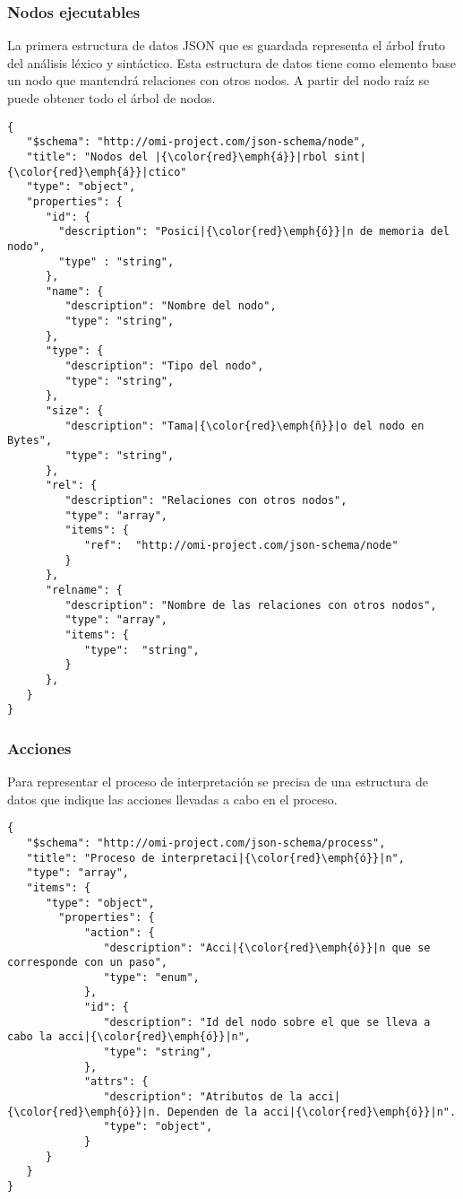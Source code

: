 \subsubsection{Nodos ejecutables}
La primera estructura de datos JSON que es guardada representa el árbol fruto del análisis léxico y sintáctico. Esta estructura de datos tiene como elemento
base un nodo que mantendrá relaciones con otros nodos. A partir del nodo raíz se puede obtener todo el árbol de nodos.


\begin{lstlisting}[language=omi]
{
   "$schema": "http://omi-project.com/json-schema/node",
   "title": "Nodos del |{\color{red}\emph{á}}|rbol sint|{\color{red}\emph{á}}|ctico"
   "type": "object",
   "properties": {
      "id": {
        "description": "Posici|{\color{red}\emph{ó}}|n de memoria del nodo",
        "type" : "string", 
      },
      "name": {
         "description": "Nombre del nodo",
         "type": "string",
      },
      "type": {
         "description": "Tipo del nodo",
         "type": "string",
      },
      "size": {
         "description": "Tama|{\color{red}\emph{ñ}}|o del nodo en Bytes",
         "type": "string",
      },
      "rel": {
         "description": "Relaciones con otros nodos",
         "type": "array",
         "items": {
            "ref":  "http://omi-project.com/json-schema/node"
         }
      },
      "relname": {
         "description": "Nombre de las relaciones con otros nodos",
         "type": "array",
         "items": {
            "type":  "string",
         }
      },
   }
}
\end{lstlisting}

\subsubsection{Acciones}
Para representar el proceso de interpretación se precisa de una estructura de datos que indique las acciones 
llevadas a cabo en el proceso.

\begin{lstlisting}[language=omi]
{
   "$schema": "http://omi-project.com/json-schema/process",
   "title": "Proceso de interpretaci|{\color{red}\emph{ó}}|n",
   "type": "array",
   "items": {
      "type": "object",
        "properties": { 
            "action": {
               "description": "Acci|{\color{red}\emph{ó}}|n que se corresponde con un paso",
               "type": "enum",
            },
            "id": {
               "description": "Id del nodo sobre el que se lleva a cabo la acci|{\color{red}\emph{ó}}|n",
               "type": "string",
            },
            "attrs": {
               "description": "Atributos de la acci|{\color{red}\emph{ó}}|n. Dependen de la acci|{\color{red}\emph{ó}}|n".
               "type": "object",
            }
      }
   }
}
\end{lstlisting}

